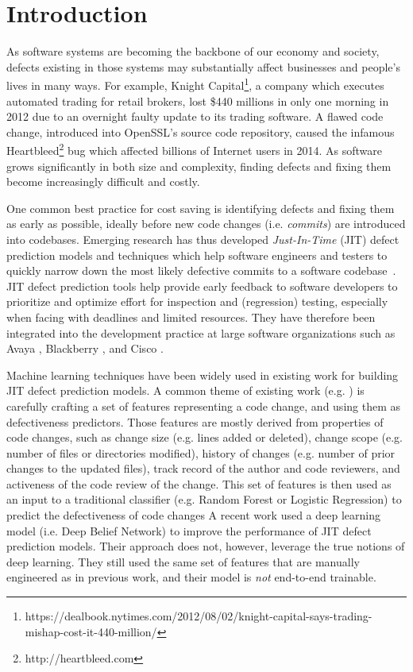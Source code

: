\section{Introduction}
\label{sec:intro}
As software systems are becoming the backbone of our economy and society, defects existing in those systems may substantially affect businesses and people's lives  in many ways. For example, Knight Capital\footnote{https://dealbook.nytimes.com/2012/08/02/knight-capital-says-trading-mishap-cost-it-440-million/}, a company which executes automated trading  for retail brokers, lost \$440 millions in only one morning in 2012 due to an overnight faulty update to its trading software. A flawed code change, introduced into OpenSSL's source code repository, caused the infamous Heartbleed\footnote{http://heartbleed.com} bug which affected billions of Internet users in 2014. As software grows significantly in both size and complexity, finding defects and fixing them become increasingly difficult and costly.

One common best practice for cost saving is identifying defects and fixing them as early as possible, ideally before new code changes (i.e. \emph{commits}) are introduced into codebases. Emerging research has thus developed \emph{Just-In-Time} (JIT) defect prediction models and techniques which help software engineers and testers to quickly narrow down the most likely defective commits to a software codebase~\cite{KameiS16,D'Ambros:2012:EDP}. JIT defect prediction tools help provide early feedback to software developers to prioritize and optimize effort for inspection and (regression) testing, especially when facing with deadlines and limited resources. They have therefore been integrated into the development practice at large software organizations such as Avaya \cite{Mockus2000}, Blackberry \cite{Shihab:2012:ISR}, and Cisco \cite{Tantithamthavorn:2015:IMP}.

Machine learning techniques have been widely used in existing work for building JIT defect prediction models. A common theme of existing work (e.g. \cite{Kamei:2013:LES,Kim:2008:CSC,Kononenko:2015,Mockus2000,McIntosh:2018:FCM}) is carefully crafting a set of features representing a code change, and using them as defectiveness predictors. Those features are mostly derived from properties of code changes, such as change size (e.g. lines added or deleted), change scope (e.g. number of files or directories modified), history of changes (e.g. number of prior changes to the updated files), track record of the author and code reviewers, and activeness of the code review of the change. This set of features is then used as an input to a traditional classifier (e.g. Random Forest or Logistic Regression) to predict the defectiveness of code changes A recent work \cite{Yang:2015:DLJ}  used a deep learning model (i.e. Deep Belief Network) to improve the performance of JIT defect prediction models. Their approach does not, however, leverage the true notions of deep learning. They still used the same set of features that are manually engineered as in previous work, and their model is \emph{not} end-to-end trainable.

